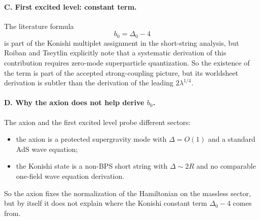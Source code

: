 \documentclass[12pt]{article}
\newcommand{\D}{\Delta}
\begin{document}
\paragraph{C. First excited level: constant term.}
The literature formula
\begin{equation}
b_0=\D_0-4
\end{equation}
is part of the Konishi multiplet assignment in the short-string analysis, but Roiban and Tseytlin
explicitly note that a systematic derivation of this contribution requires zero-mode superparticle
quantization.  So the existence of the term is part of the accepted strong-coupling picture, but its
worldsheet derivation is subtler than the derivation of the leading $2\lambda^{1/4}$.

\paragraph{D. Why the axion does not help derive $b_0$.}
The axion and the first excited level probe different sectors:
\begin{itemize}
\item the axion is a protected supergravity mode with $\D=O(1)$ and a standard AdS wave equation;
\item the Konishi state is a non-BPS short string with $\D\sim 2R$ and no comparable one-field wave
equation derivation.
\end{itemize}
So the axion fixes the normalization of the Hamiltonian on the massless sector, but by itself it does
not explain where the Konishi constant term $\D_0-4$ comes from.
\end{document}
